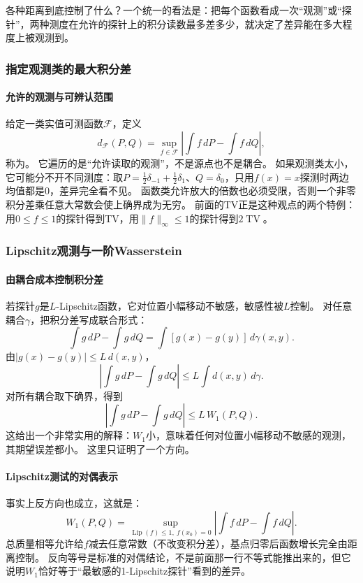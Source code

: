 各种距离到底控制了什么？一个统一的看法是：把每个函数看成一次“观测”或“探针”，两种测度在允许的探针上的积分读数最多差多少，就决定了差异能在多大程度上被观测到。

\subsubsection{指定观测类的最大积分差}

\paragraph{允许的观测与可辨认范围}

给定一类实值可测函数$\mathcal F$，定义
\[
 d_{\mathcal F}(P,Q)
 =\sup_{f\in\mathcal F}\left|\int f\,dP-\int f\,dQ\right|,
\]
称为。
它遍历的是“允许读取的观测”，不是源点也不是耦合。
如果观测类太小，它可能分不开不同测度：取$P=\frac12\delta_{-1}+\frac12\delta_1$、$Q=\delta_0$，只用$f(x)=x$探测时两边均值都是$0$，差异完全看不见。
函数类允许放大的倍数也必须受限，否则一个非零积分差乘任意大常数会使上确界成为无穷。
前面的TV正是这种观点的两个特例：用$0\leq f\leq1$的探针得到TV，用$\|f\|_\infty\leq1$的探针得到$2\operatorname{TV}$。

\subsubsection{Lipschitz观测与一阶Wasserstein}

\paragraph{由耦合成本控制积分差}

若探针$g$是$L$-Lipschitz函数，它对位置小幅移动不敏感，敏感性被$L$控制。
对任意耦合$\gamma$，把积分差写成联合形式：
\[
 \int g\,dP-\int g\,dQ
 =\int[g(x)-g(y)]\,d\gamma(x,y).
\]
由$|g(x)-g(y)|\leq L\,d(x,y)$，
\[
 \left|\int g\,dP-\int g\,dQ\right|
 \leq L\int d(x,y)\,d\gamma.
\]
对所有耦合取下确界，得到
\[
 \left|\int g\,dP-\int g\,dQ\right|\leq L\,W_1(P,Q).
\]
这给出一个非常实用的解释：$W_1$小，意味着任何对位置小幅移动不敏感的观测，其期望误差都小。
这里只证明了一个方向。

\paragraph{Lipschitz测试的对偶表示}

事实上反方向也成立，这就是：
\[
 W_1(P,Q)
 =\sup_{\operatorname{Lip}(f)\leq1,\ f(x_0)=0}
 \left|\int f\,dP-\int f\,dQ\right|.
\]
总质量相等允许给$f$减去任意常数（不改变积分差），基点归零后函数增长完全由距离控制。
反向等号是标准的对偶结论，不是前面那一行不等式能推出来的，但它说明$W_1$恰好等于“最敏感的1-Lipschitz探针”看到的差异。


